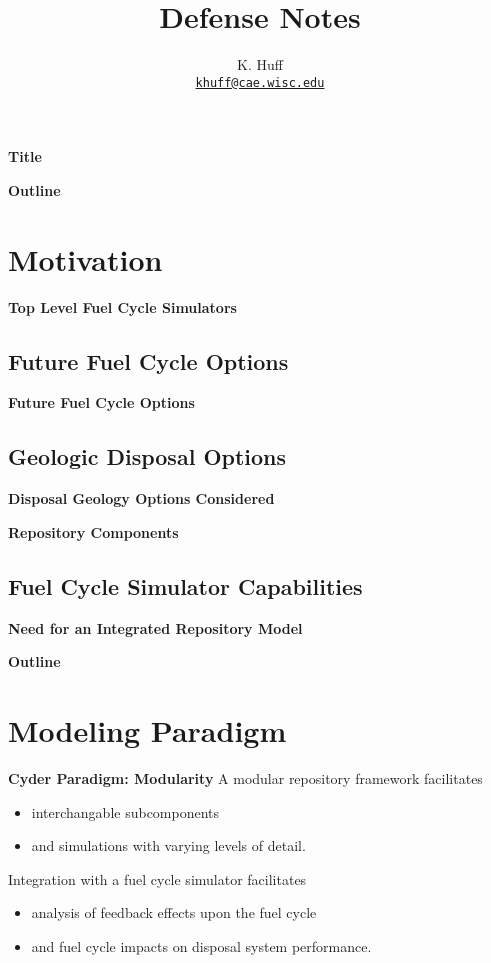 \documentclass[letterpaper]{article}
\author{K. Huff
\\ \href{mailto:khuff@cae.wisc.edu}{\texttt{khuff@cae.wisc.edu}}
}
\date{}
\title{Defense Notes}
\begin{document}
\maketitle

\textbf{Title}


\textbf{Outline}


\section{Motivation}

\textbf{Top Level Fuel Cycle Simulators}


\subsection{Future Fuel Cycle Options}
\textbf{Future Fuel Cycle Options}



\subsection{Geologic Disposal Options}
\textbf{Disposal Geology Options Considered}



\textbf{Repository Components}



\subsection{Fuel Cycle Simulator Capabilities}
\textbf{Need for an Integrated Repository Model}


\textbf{Outline}

\section{Modeling Paradigm}
\textbf{Cyder Paradigm: Modularity}
A modular repository framework facilitates
\begin{itemize}
\item interchangable subcomponents
\item and simulations with varying levels of detail.
\end{itemize}
Integration with a fuel cycle simulator facilitates
\begin{itemize}
\item analysis of feedback effects upon the fuel cycle
\item and fuel cycle impacts on disposal system performance.
\end{itemize}
\end{document}
